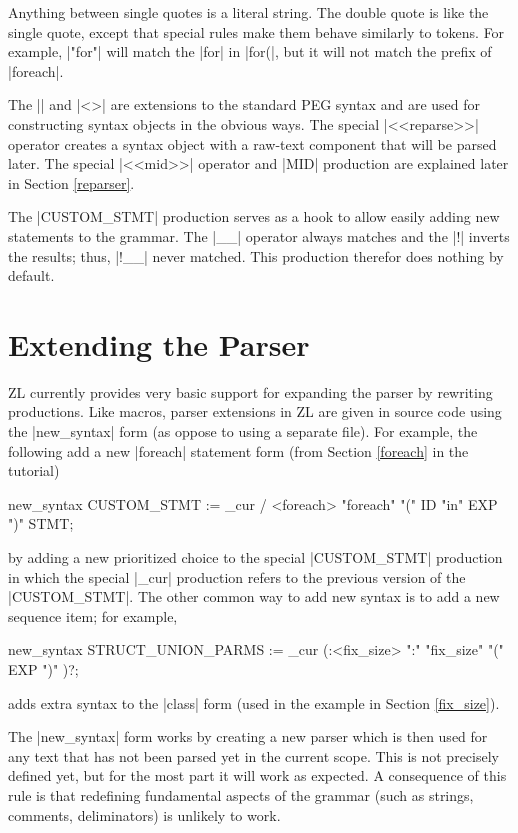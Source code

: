 Anything between single quotes is a literal string.  The double quote
is like the single quote, except that special rules make them behave
similarly to tokens.  For example, |"for"| will match the |for| in
|for(|, but it will not match the prefix of |foreach|.  

The |{}| and |<>| are extensions to the standard PEG syntax and are
used for constructing syntax objects in the obvious ways.  The special
|<<reparse>>| operator creates a syntax object with a raw-text
component that will be parsed later.  The special |<<mid>>| operator
and |MID| production are explained later in Section \ref{reparser}.

The |CUSTOM_STMT| production serves as a hook to allow easily adding
new statements to the grammar.  The |__| operator always matches and
the |!| inverts the results; thus, |!__| never matched.  This
production therefor does nothing by default.

\section{Extending the Parser}
\label{extending-parser}

ZL currently provides very basic support for expanding the parser by
rewriting productions.  Like macros, parser extensions in ZL are given
in source code using the |new_syntax| form (as oppose to using a
separate file).  For example, the following add a new |foreach|
statement form (from Section \ref{foreach} in the tutorial)
\begin{code}
new_syntax {
  CUSTOM_STMT := _cur / <foreach> "foreach" "(" {ID} "in" {EXP} ")" {STMT};
}
\end{code}
by adding a new prioritized choice to the special |CUSTOM_STMT|
production in which the special |_cur| production refers to the
previous version of the |CUSTOM_STMT|.  The other common way to add
new syntax is to add a new sequence item; for example,
\begin{code}
new_syntax {
  STRUCT_UNION_PARMS := _cur (:<fix_size> ":" "fix_size" "(" {EXP} ")" )?;
}
\end{code}
adds extra syntax to the |class| form (used in the example in Section
\ref{fix_size}).

The |new_syntax| form works by creating a new parser which is then
used for any text that has not been parsed yet in the current scope.
This is not precisely defined yet, but for the most part it will work as
expected.  A consequence of this rule is that redefining fundamental
aspects of the grammar (such as strings, comments, deliminators) is
unlikely to work.



